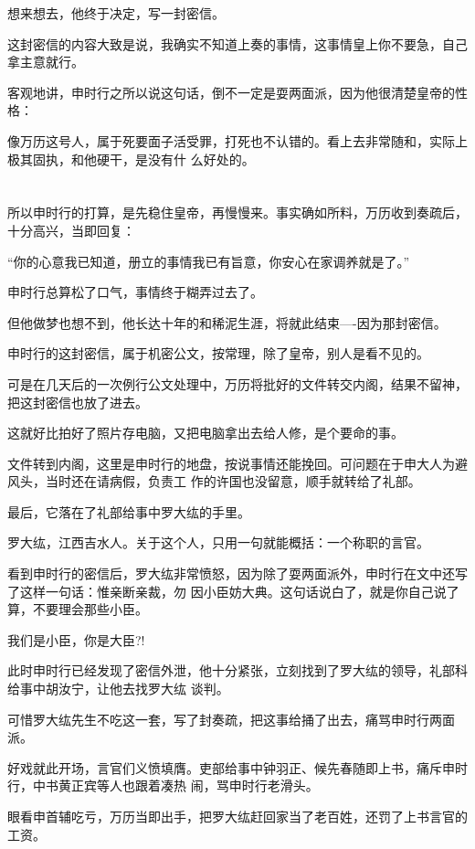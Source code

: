 \documentclass[11pt,a4paper,onecolumn]{article}
\begin{document}
想来想去，他终于决定，写一封密信。

这封密信的内容大致是说，我确实不知道上奏的事情，这事情皇上你不要急，自己拿主意就行。

客观地讲，申时行之所以说这句话，倒不一定是耍两面派，因为他很清楚皇帝的性格：

像万历这号人，属于死要面子活受罪，打死也不认错的。看上去非常随和，实际上极其固执，和他硬干，是没有什
么好处的。

\section[\thesection]{}

所以申时行的打算，是先稳住皇帝，再慢慢来。事实确如所料，万历收到奏疏后，十分高兴，当即回复：

``你的心意我已知道，册立的事情我已有旨意，你安心在家调养就是了。''

申时行总算松了口气，事情终于糊弄过去了。

但他做梦也想不到，他长达十年的和稀泥生涯，将就此结束----因为那封密信。

申时行的这封密信，属于机密公文，按常理，除了皇帝，别人是看不见的。

可是在几天后的一次例行公文处理中，万历将批好的文件转交内阁，结果不留神，把这封密信也放了进去。

这就好比拍好了照片存电脑，又把电脑拿出去给人修，是个要命的事。

文件转到内阁，这里是申时行的地盘，按说事情还能挽回。可问题在于申大人为避风头，当时还在请病假，负责工
作的许国也没留意，顺手就转给了礼部。

最后，它落在了礼部给事中罗大纮的手里。

罗大纮，江西吉水人。关于这个人，只用一句就能概括：一个称职的言官。

看到申时行的密信后，罗大纮非常愤怒，因为除了耍两面派外，申时行在文中还写了这样一句话：惟亲断亲裁，勿
因小臣妨大典。这句话说白了，就是你自己说了算，不要理会那些小臣。

我们是小臣，你是大臣?!

此时申时行已经发现了密信外泄，他十分紧张，立刻找到了罗大纮的领导，礼部科给事中胡汝宁，让他去找罗大纮
谈判。

可惜罗大纮先生不吃这一套，写了封奏疏，把这事给捅了出去，痛骂申时行两面派。

好戏就此开场，言官们义愤填膺。吏部给事中钟羽正、候先春随即上书，痛斥申时行，中书黄正宾等人也跟着凑热
闹，骂申时行老滑头。

眼看申首辅吃亏，万历当即出手，把罗大纮赶回家当了老百姓，还罚了上书言官的工资。
\end{document}
